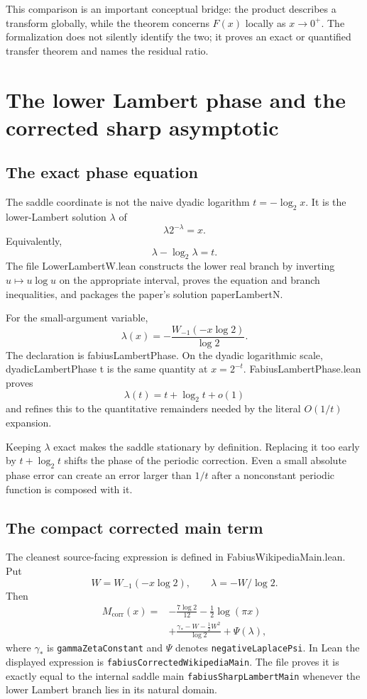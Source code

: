 \documentclass[11pt,a4paper,openany]{book}
\def\module#1{#1.lean}
\def\decl#1{#1}
\newcommand{\module}[1]{\nolinkurl{#1.lean}}
\newcommand{\decl}[1]{\texttt{\detokenize{#1}}}
\newcommand{\pathbreak}[1]{\nolinkurl{#1}}
\begin{document}
This comparison is an important conceptual bridge: the product describes a
transform globally, while the theorem concerns $F(x)$ locally as $x\to0^+$.
The formalization does not silently identify the two; it proves an exact or
quantified transfer theorem and names the residual ratio.

\chapter[The lower Lambert phase and the corrected sharp asymptotic]{The lower Lambert phase and the\\corrected sharp asymptotic}
\label{ch:sharp}

\section{The exact phase equation}
The saddle coordinate is not the naive dyadic logarithm
$t=-\log_2x$.  It is the lower-Lambert solution $\lambda$ of
\[
 \lambda 2^{-\lambda}=x.
\]
Equivalently,
\[
 \lambda-\log_2\lambda=t.
\]
The file \module{LowerLambertW} constructs the lower real branch by inverting
$u\mapsto u\log u$ on the appropriate interval, proves the equation and branch
inequalities, and packages the paper's solution \decl{paperLambertN}.

For the small-argument variable,
\[
 \lambda(x)=
 -\frac{W_{-1}(-x\log2)}{\log2}.
\]
The declaration is \decl{fabiusLambertPhase}.  On the dyadic logarithmic scale,
\decl{dyadicLambertPhase t} is the same quantity at $x=2^{-t}$.
\module{FabiusLambertPhase} proves
\[
 \lambda(t)=t+\log_2t+o(1)
\]
and refines this to the quantitative remainders needed by the literal
$O(1/t)$ expansion.

\begin{proofidea}
Keeping $\lambda$ exact makes the saddle stationary by definition.  Replacing
it too early by $t+\log_2t$ shifts the phase of the periodic correction.  Even
a small absolute phase error can create an error larger than $1/t$ after a
nonconstant periodic function is composed with it.
\end{proofidea}

\section{The compact corrected main term}
The cleanest source-facing expression is defined in
\module{FabiusWikipediaMain}.  Put
\[
 W=W_{-1}(-x\log2),\qquad
 \lambda=-W/\log2.
\]
Then
\begin{align*}
 M_{\mathrm{corr}}(x)
  ={}&-\frac{7\log2}{12}-\frac12\log(\pi x)\\
    &+\frac{\gamma_\ast-W-\tfrac12W^2}{\log2}
      +\Psi(\lambda),
\end{align*}
where $\gamma_\ast$ is \pathbreak{gammaZetaConstant} and $\Psi$ denotes
\pathbreak{negativeLaplacePsi}.  In Lean the displayed expression is
\pathbreak{fabiusCorrectedWikipediaMain}.  The file proves it is exactly equal
to the internal saddle main \pathbreak{fabiusSharpLambertMain} whenever the lower
Lambert branch lies in its natural domain.
\end{document}
